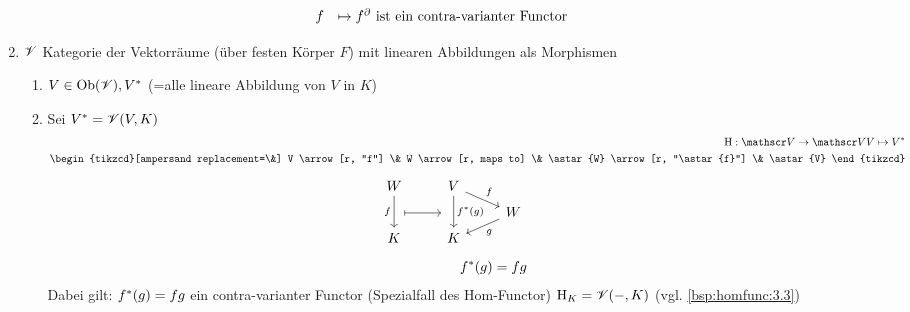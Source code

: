 \begin{beispiel}
\begin{enumerate}
\begin{align*}
\begin{matrix}
			f &\mapsto f^{\partial}
			\end{matrix} \text{ ist ein contra-varianter Functor}
		\end{align*}
		\item $\mathscr V$ Kategorie der Vektorräume (über festen Körper $F$) mit linearen Abbildungen als Morphismen
		\begin{enumerate}[label=]
			\item $V \in \operatorname{Ob}(\mathscr V), V^{\ast}$  (=alle lineare Abbildung von $V$ in $K$)
			\item Sei $V^{\ast} = \mathscr V(V,K)$
			\begin{align*}
				\HFunc: \V \to \V \mit V \mapsto \astar{V}\\
				\begin{tikzcd}[ampersand replacement=\&]
				V \arrow[r, "f"] \& W \arrow[r, maps to] \& \astar{W} \arrow[r, "\astar{f}"] \& \astar{V}
				\end{tikzcd}
			\end{align*}
			\begin{align*}
				\begin{tikzcd}[row sep=tiny,ampersand replacement=\&]
					W \arrow[dd, "f"']             \& V \arrow[dd, "\astar{f}(g)"] \arrow[dr, "f"] \&                  \\
					\arrow[r,maps to, shorten=1mm] \& \                                 \& W \arrow[dl, "g"]\\
					K                              \& K                                 \&                  \\
				\end{tikzcd}\\
				\astar{f}(g) = fg
			\end{align*}
			Dabei gilt: $f^{\ast}(g) = fg$ ein contra-varianter Functor (Spezialfall des Hom-Functor) $\operatorname{H}_{K} = \mathscr V(-,K)$ (vgl. \ref{bsp:homfunc:3.3})
		\end{enumerate}
	\end{enumerate}
\end{beispiel}
